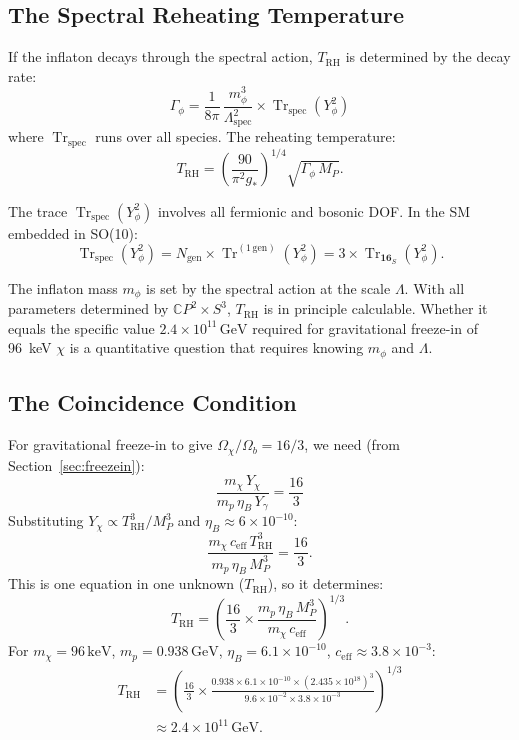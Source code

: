 \documentclass[11pt]{article}
\theoremstyle{definition}
\theoremstyle{remark}
\newcommand{\CP}{\mathbb{C}P}
\newcommand{\Tr}{\operatorname{Tr}}
\newcommand{\keV}{\,\mathrm{keV}}
\newcommand{\GeV}{\,\mathrm{GeV}}
\newcommand{\MP}{M_P}
\begin{document}
\subsection{The Spectral Reheating Temperature}

If the inflaton decays through the spectral action, $T_\mathrm{RH}$ is
determined by the decay rate:
\begin{equation}
  \Gamma_\phi = \frac{1}{8\pi}\,\frac{m_\phi^3}{\Lambda_\mathrm{spec}^2}
  \times \Tr_\mathrm{spec}(Y_\phi^2)
\end{equation}
where $\Tr_\mathrm{spec}$ runs over all species. The reheating temperature:
\begin{equation}
  T_\mathrm{RH} = \left(\frac{90}{\pi^2 g_*}\right)^{1/4}
  \sqrt{\Gamma_\phi\,\MP}.
\end{equation}

The trace $\Tr_\mathrm{spec}(Y_\phi^2)$ involves all fermionic and bosonic
DOF. In the SM embedded in SO(10):
\begin{equation}
  \Tr_\mathrm{spec}(Y_\phi^2) = N_\mathrm{gen} \times \Tr^{(1\,\mathrm{gen})}(Y_\phi^2)
  = 3 \times \Tr_{\mathbf{16}_S}(Y_\phi^2).
\end{equation}

The inflaton mass $m_\phi$ is set by the spectral action at the scale
$\Lambda$. With all parameters determined by $\CP^2 \times S^3$, $T_\mathrm{RH}$
is in principle calculable. Whether it equals the specific value
$2.4 \times 10^{11}\GeV$ required for gravitational freeze-in of 96~keV $\chi$
is a quantitative question that requires knowing $m_\phi$ and $\Lambda$.

\subsection{The Coincidence Condition}

For gravitational freeze-in to give $\Omega_\chi/\Omega_b = 16/3$, we need
(from Section~\ref{sec:freezein}):
\begin{equation}
  \frac{m_\chi\,Y_\chi}{m_p\,\eta_B\,Y_\gamma} = \frac{16}{3}
\end{equation}
Substituting $Y_\chi \propto T_\mathrm{RH}^3/\MP^3$ and
$\eta_B \approx 6 \times 10^{-10}$:
\begin{equation}
  \frac{m_\chi\,c_\mathrm{eff}\,T_\mathrm{RH}^3}{m_p\,\eta_B\,\MP^3}
  = \frac{16}{3}.
\end{equation}
This is one equation in one unknown ($T_\mathrm{RH}$), so it determines:
\begin{equation}
  T_\mathrm{RH} = \left(\frac{16}{3} \times \frac{m_p\,\eta_B\,\MP^3}
  {m_\chi\,c_\mathrm{eff}}\right)^{1/3}.
\end{equation}
For $m_\chi = 96\keV$, $m_p = 0.938\GeV$, $\eta_B = 6.1 \times 10^{-10}$,
$c_\mathrm{eff} \approx 3.8 \times 10^{-3}$:
\begin{align}
  T_\mathrm{RH} &= \left(\frac{16}{3} \times
  \frac{0.938 \times 6.1 \times 10^{-10} \times (2.435 \times 10^{18})^3}
  {9.6 \times 10^{-2} \times 3.8 \times 10^{-3}}\right)^{1/3} \\
  &\approx 2.4 \times 10^{11}\GeV.
\end{align}
\end{document}
